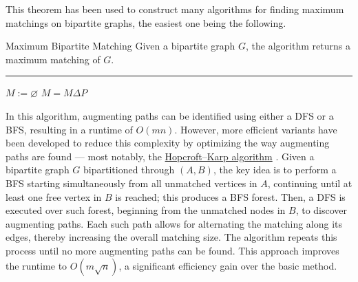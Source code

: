 \documentclass[a4paper, 12pt]{report}
\begin{document}
    This theorem has been used to construct many algorithms for finding maximum matchings on bipartite graphs, the easiest one being the following.

    \begin{framedalgo}{Maximum Bipartite Matching}
        Given a bipartite graph $G$, the algorithm returns a maximum matching of $G$. \\
        \hrule

        \quad
        \begin{algorithmic}[1]
                \State $M := \varnothing$
                    \State $M = M \Delta P$
                \EndWhile
            \EndFunction
        \end{algorithmic}
    \end{framedalgo}

    In this algorithm, augmenting paths can be identified using either a DFS or a BFS, resulting in a runtime of $O(mn)$. However, more efficient variants have been developed to reduce this complexity by optimizing the way augmenting paths are found --- most notably, the \href{https://en.wikipedia.org/wiki/Hopcroft%E2%80%93Karp_algorithm}{Hopcroft–Karp algorithm} \cite{hopcroft}. Given a bipartite graph $G$ bipartitioned through $(A, B)$, the key idea is to perform a BFS starting simultaneously from all unmatched vertices in $A$, continuing until at least one free vertex in $B$ is reached; this produces a BFS forest. Then, a DFS is executed over such forest, beginning from the unmatched nodes in $B$, to discover augmenting paths. Each such path allows for alternating the matching along its edges, thereby increasing the overall matching size. The algorithm repeats this process until no more augmenting paths can be found. This approach improves the runtime to $O(m \sqrt n)$, a significant efficiency gain over the basic method.
\end{document}
